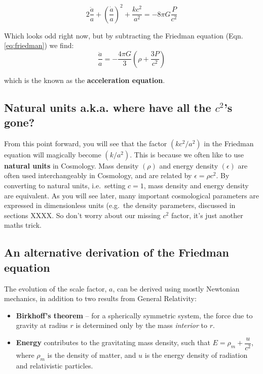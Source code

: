 \documentclass[11pt,a4paper,notoc]{tufte-handout}
\begin{document}
\begin{equation}
2\dfrac{\ddot{a}}{a} + \left(\dfrac{\dot{a}}{a}\right)^2 + \dfrac{kc^2}{a^2} = -8\pi G \dfrac{P}{c^2}
\label{eq:acc-part}
\end{equation}

Which looks odd right now, but by subtracting the Friedman equation (Eqn. \eqref{eq:friedman}) we find:
\begin{equation}
    \dfrac{\ddot{a}}{a} = -\dfrac{4\pi G}{3}\left(\rho + \dfrac{3P}{c^2}\right)
\label{eq:acceleration}
\end{equation}

which is the known as the \textbf{acceleration equation}.

\hypertarget{sec:natural_units}{%
\subsection{\texorpdfstring{Natural units a.k.a. where have all the \(c^2\)'s gone?}{Natural units a.k.a. where have all the c\^{}2's gone?}}\label{sec:natural_units}}

From this point forward, you will see that the factor
\(\left(k c^2/a^2\right)\) in the Friedman equation will magically become
\(\left(k/a^2\right)\). This is because we often like to use \textbf{natural
units} in Cosmology. Mass density \(\left(\rho\right)\) and energy
density \(\left(\epsilon\right)\) are often used interchangeably in
Cosmology, and are related by \(\epsilon = \rho c^2\). By converting to
natural units, i.e.~setting \(c=1\), mass density and energy density are
equivalent. As you will see later, many important cosmological
parameters are expressed in dimensionless units (e.g.~the density
parameters, discussed in sections XXXX. So don't worry about our missing \(c^2\)
factor, it's just another maths trick.

\hypertarget{sec:alt_friedman}{%
\subsection{An alternative derivation of the Friedman equation}\label{sec:alt_friedman}}

The evolution of the scale factor, \(a\), can be derived using mostly
Newtonian mechanics, in addition to two results from General Relativity:

\begin{itemize}
\item
  \textbf{Birkhoff's theorem} -- for a spherically symmetric system, the
  force due to gravity at radius \(r\) is determined only by the mass
  \emph{interior} to \(r\).
\item
  \textbf{Energy} contributes to the gravitating mass density, such that
  \(E = \rho_m + \dfrac{u}{c^2}\), where \(\rho_m\) is the density of
  matter, and \(u\) is the energy density of radiation and relativistic
  particles.
\end{itemize}
\end{document}
